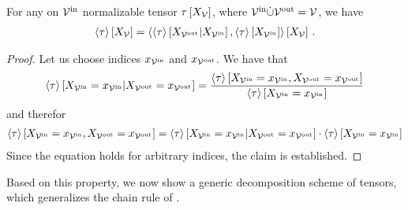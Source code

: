 \begin{theorem}
    \label{the:normalizationContractionEQ}
    For any on $\mathcal{V}^{\mathrm{in}}$ normalizable tensor $\tau\left[X_{\mathcal{V}}\right]$, where $\mathcal{V}^{\mathrm{in}}\dot{\cup}\mathcal{V}^{\mathrm{out}}=\mathcal{V}$, we have
    \begin{align*}
        \left\langle \tau\right\rangle \left[ X_{\mathcal{V}} \right]
        = \left\langle \left\langle \tau\right\rangle \left[ X_{\mathcal{V}^{\mathrm{out}}} | X_{\mathcal{V}^{\mathrm{in}}} \right],\left\langle \tau\right\rangle \left[ X_{\mathcal{V}^{\mathrm{in}}} \right]\right\rangle \left[ X_{\mathcal{V}} \right] \, .
    \end{align*}
\end{theorem}
\begin{proof}
    Let us choose indices $x_{\mathcal{V}^{\mathrm{in}}}$ and $x_{\mathcal{V}^{\mathrm{out}}}$.
    We have that
    \begin{align*}
        \left\langle \tau\right\rangle \left[ X_{\mathcal{V}^{\mathrm{in}}}=x_{\mathcal{V}^{\mathrm{in}}} | X_{\mathcal{V}^{\mathrm{out}}}=x_{\mathcal{V}^{\mathrm{out}}} \right]
        = \frac{
            \left\langle \tau\right\rangle \left[ X_{\mathcal{V}^{\mathrm{in}}}=x_{\mathcal{V}^{\mathrm{in}}},X_{\mathcal{V}^{\mathrm{out}}}=x_{\mathcal{V}^{\mathrm{out}}} \right]
        }{
            \left\langle \tau\right\rangle \left[ X_{\mathcal{V}^{\mathrm{in}}}=x_{\mathcal{V}^{\mathrm{in}}} \right]
        }
    \end{align*}
    and therefor
    \begin{align*}
        \left\langle \tau\right\rangle \left[ X_{\mathcal{V}^{\mathrm{in}}}=x_{\mathcal{V}^{\mathrm{in}}},X_{\mathcal{V}^{\mathrm{out}}}=x_{\mathcal{V}^{\mathrm{out}}} \right] =
        \left\langle \tau\right\rangle \left[ X_{\mathcal{V}^{\mathrm{in}}}=x_{\mathcal{V}^{\mathrm{in}}} | X_{\mathcal{V}^{\mathrm{out}}}=x_{\mathcal{V}^{\mathrm{out}}} \right]
        \cdot
        \left\langle \tau\right\rangle \left[ X_{\mathcal{V}^{\mathrm{in}}}=x_{\mathcal{V}^{\mathrm{in}}} \right]
    \end{align*}
    Since the equation holds for arbitrary indices, the claim is established.
\end{proof}

Based on this property, we now show a generic decomposition scheme of tensors, which generalizes the chain rule of .

